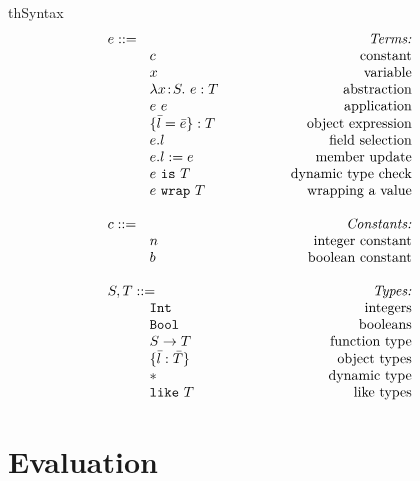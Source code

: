 \documentclass{article}
\newcommand{\mkrefl}[3]{\t{ref}^{#3}~{#1}~#2}
\newcommand{\derefl}[2]{!^{#2}{#1}}
\newcommand{\assignl}[3]{{#1}:=^{#3}{#2}}
\newcommand{\Ref}[1]{\t{Ref}~{#1}}
\newcommand{\lam}[4]{\lambda#1\!:\!#2.\,\,#4:#3}
\newcommand{\lamt}[2]{#1\rightarrow #2}
\newcommand{\app}[2]{#1~#2}
\newcommand{\Int}{\t{Int}}
\newcommand{\Bool}{\t{Bool}}
\newcommand{\dynamic}{\t{*}}
\newcommand{\true}{\t{true}}
\newcommand{\false}{\t{false}}
\newcommand{\lett}[4]{\t{letXXX}~{#1}:{#2}={#3}~\t{in}~{#4}}
\newcommand{\cast}[2]{#1~\t{is}~#2}
\renewcommand{\t}[1]{{\tt #1}}
\newcommand{\objty}[1]{\{#1\}}
\newcommand{\obje}[2]{\{#1\}:{#2}}
\newcommand{\objget}[2]{#1.#2}
\newcommand{\objcall}[2]{#1.#2()}
\newcommand{\objset}[3]{#1.#2:=#3}
\newcommand{\wrapty}[1]{\t{XXXX wrap}~#1}
\newcommand{\likety}[1]{\t{like}~#1}
\newcommand{\wrap}[2]{#1~\t{wrap}~#2}
\begin{document}
\begin{displayfigure}{th}{\label{fig:syntax}Syntax}
\[
\begin{array}{llr}
	\mydefhead{e ::=\qquad\qquad\qquad\qquad\qquad}{Terms:} 
	\mydefcase{c								}{constant} 
	\mydefcase{x								}{variable} 
	\mydefcase{\lam{x}{S}{T}{e} 				}{abstraction} 
	\mydefcase{\app{e}{e} 					}{application} 
	\mydefcase{\obje{\bar{l}=\bar{e}}{T}		}{object expression}
	\mydefcase{\objget{e}{l}					}{field selection}
	\mydefcase{\objset{e}{l}{e}				}{member update}
	\mydefcase{\cast{e}{T}					}{dynamic type check}
	\mydefcase{\wrap{e}{T}					}{wrapping a value}
\\
	\mydefhead{c ::=}{Constants:} 
	\mydefcase{n								}{integer constant} 
	\mydefcase{b								}{boolean constant} 
\\
	\mydefhead{S,T::=}{Types:} 
	\mydefcase{\Int 							}{integers}
	\mydefcase{\Bool							}{booleans}
	\mydefcase{\lamt{S}{T} 					}{function type}
	\mydefcase{\objty{\bar{l}:\bar{T}}	   	}{object types}
	\mydefcase{\dynamic 		    				}{dynamic type}
	\mydefcase{\likety{T}					}{like types}
	
\end{array}
\]
\end{displayfigure}


\clearpage
\section{Evaluation}
\end{document}
